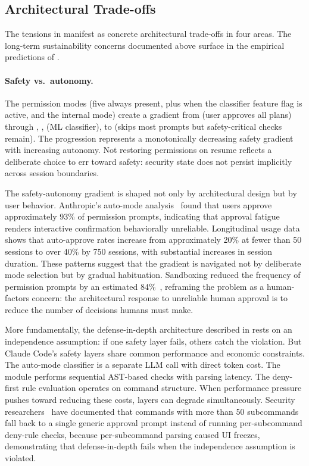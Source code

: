 \subsection{Architectural Trade-offs}
\label{sec:discuss:tradeoffs}

The tensions in  manifest as concrete architectural trade-offs in four areas. The long-term sustainability concerns documented above surface in the empirical predictions of .

\paragraph{Safety vs.\ autonomy.}
The permission modes (five always present, plus  when the classifier feature flag is active, and the internal  mode) create a gradient from  (user approves all plans) through , ,  (ML classifier), to  (skips most prompts but safety-critical checks remain). The progression represents a monotonically decreasing safety gradient with increasing autonomy. Not restoring permissions on resume reflects a deliberate choice to err toward safety: security state does not persist implicitly across session boundaries.

The safety-autonomy gradient is shaped not only by architectural design but by user behavior. Anthropic's auto-mode analysis~\citep{anthropic2026automode} found that users approve approximately 93\% of permission prompts, indicating that approval fatigue renders interactive confirmation behaviorally unreliable. Longitudinal usage data~\citep{anthropic2026autonomy} shows that auto-approve rates increase from approximately 20\% at fewer than 50 sessions to over 40\% by 750 sessions, with substantial increases in session duration. These patterns suggest that the gradient is navigated not by deliberate mode selection but by gradual habituation. Sandboxing reduced the frequency of permission prompts by an estimated 84\%~\citep{anthropic2025sandboxing}, reframing the problem as a human-factors concern: the architectural response to unreliable human approval is to reduce the number of decisions humans must make.

More fundamentally, the defense-in-depth architecture described in  rests on an independence assumption: if one safety layer fails, others catch the violation. But Claude Code's safety layers share common performance and economic constraints. The auto-mode classifier is a separate LLM call with direct token cost. The  module performs sequential AST-based checks with parsing latency. The deny-first rule evaluation operates on command structure. When performance pressure pushes toward reducing these costs, layers can degrade simultaneously. Security researchers~\citep{adversa2026bypass} have documented that commands with more than 50 subcommands fall back to a single generic approval prompt instead of running per-subcommand deny-rule checks, because per-subcommand parsing caused UI freezes, demonstrating that defense-in-depth fails when the independence assumption is violated.

